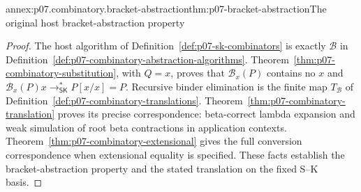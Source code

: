\begin{annexitem}{annex:p07.combinatory.bracket-abstraction}{thm:p07-bracket-abstraction}{The original host bracket-abstraction property}
\begin{proof}
The host algorithm of Definition~\ref{def:p07-sk-combinators} is exactly
\(\mathcal B\) in Definition~\ref{def:p07-combinatory-abstraction-algorithms}.
Theorem~\ref{thm:p07-combinatory-substitution}, with \(Q=x\), proves that
\(\mathcal B_x(P)\) contains no \(x\) and
\(\mathcal B_x(P)x\longrightarrow_{\mathsf{SK}}^*P[x/x]=P\).
Recursive binder elimination is the finite map \(T_{\mathcal B}\) of
Definition~\ref{def:p07-combinatory-translations}.
Theorem~\ref{thm:p07-combinatory-translation} proves its precise correspondence:
beta-correct lambda expansion and weak simulation of root beta contractions
in application contexts.  Theorem~\ref{thm:p07-combinatory-extensional} gives
the full conversion correspondence when extensional equality is specified.
These facts establish the bracket-abstraction property and the stated
translation on the fixed S--K basis.
\end{proof}
\end{annexitem}

